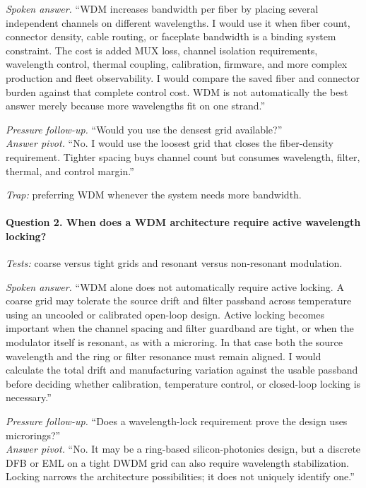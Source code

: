 \textit{Spoken answer.}
``WDM increases bandwidth per fiber by placing several independent channels on
different wavelengths. I would use it when fiber count, connector density, cable
routing, or faceplate bandwidth is a binding system constraint. The cost is
added MUX loss, channel isolation requirements, wavelength control, thermal
coupling, calibration, firmware, and more complex production and fleet
observability. I would compare the saved fiber and connector burden against that
complete control cost. WDM is not automatically the best answer merely because
more wavelengths fit on one strand.''

\textit{Pressure follow-up.} ``Would you use the densest grid available?''\\
\textit{Answer pivot.} ``No. I would use the loosest grid that closes the
fiber-density requirement. Tighter spacing buys channel count but consumes
wavelength, filter, thermal, and control margin.''

\textit{Trap:} preferring WDM whenever the system needs more bandwidth.

\paragraph{Question 2. When does a WDM architecture require active wavelength
locking?}
\textit{Tests:} coarse versus tight grids and resonant versus non-resonant
modulation.

\textit{Spoken answer.}
``WDM alone does not automatically require active locking. A coarse grid may
tolerate the source drift and filter passband across temperature using an
uncooled or calibrated open-loop design. Active locking becomes important when
the channel spacing and filter guardband are tight, or when the modulator itself
is resonant, as with a microring. In that case both the source wavelength and
the ring or filter resonance must remain aligned. I would calculate the total
drift and manufacturing variation against the usable passband before deciding
whether calibration, temperature control, or closed-loop locking is necessary.''

\textit{Pressure follow-up.} ``Does a wavelength-lock requirement prove the
design uses microrings?''\\
\textit{Answer pivot.} ``No. It may be a ring-based silicon-photonics design,
but a discrete DFB or EML on a tight DWDM grid can also require wavelength
stabilization. Locking narrows the architecture possibilities; it does not
uniquely identify one.''

